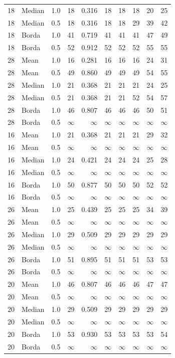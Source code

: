\begin{longtable}{llrrr rr r rr}
18 & Median & 1.0 & 18 & 0.316 & 18 & 18 & 18 & 20 & 25 \\
18 & Median & 0.5 & 18 & 0.316 & 18 & 18 & 29 & 39 & 42 \\
18 & Borda & 1.0 & 41 & 0.719 & 41 & 41 & 41 & 47 & 49 \\
18 & Borda & 0.5 & 52 & 0.912 & 52 & 52 & 52 & 55 & 55 \\
28 & Mean & 1.0 & 16 & 0.281 & 16 & 16 & 16 & 24 & 31 \\
28 & Mean & 0.5 & 49 & 0.860 & 49 & 49 & 49 & 54 & 55 \\
28 & Median & 1.0 & 21 & 0.368 & 21 & 21 & 21 & 24 & 25 \\
28 & Median & 0.5 & 21 & 0.368 & 21 & 21 & 52 & 54 & 57 \\
28 & Borda & 1.0 & 46 & 0.807 & 46 & 46 & 46 & 50 & 51 \\
28 & Borda & 0.5 & $\infty$ & $\infty$ & $\infty$ & $\infty$ & $\infty$ & $\infty$ & $\infty$ \\
16 & Mean & 1.0 & 21 & 0.368 & 21 & 21 & 21 & 29 & 32 \\
16 & Mean & 0.5 & $\infty$ & $\infty$ & $\infty$ & $\infty$ & $\infty$ & $\infty$ & $\infty$ \\
16 & Median & 1.0 & 24 & 0.421 & 24 & 24 & 24 & 25 & 28 \\
16 & Median & 0.5 & $\infty$ & $\infty$ & $\infty$ & $\infty$ & $\infty$ & $\infty$ & $\infty$ \\
16 & Borda & 1.0 & 50 & 0.877 & 50 & 50 & 50 & 52 & 52 \\
16 & Borda & 0.5 & $\infty$ & $\infty$ & $\infty$ & $\infty$ & $\infty$ & $\infty$ & $\infty$ \\
26 & Mean & 1.0 & 25 & 0.439 & 25 & 25 & 25 & 34 & 39 \\
26 & Mean & 0.5 & $\infty$ & $\infty$ & $\infty$ & $\infty$ & $\infty$ & $\infty$ & $\infty$ \\
26 & Median & 1.0 & 29 & 0.509 & 29 & 29 & 29 & 29 & 29 \\
26 & Median & 0.5 & $\infty$ & $\infty$ & $\infty$ & $\infty$ & $\infty$ & $\infty$ & $\infty$ \\
26 & Borda & 1.0 & 51 & 0.895 & 51 & 51 & 51 & 53 & 53 \\
26 & Borda & 0.5 & $\infty$ & $\infty$ & $\infty$ & $\infty$ & $\infty$ & $\infty$ & $\infty$ \\
20 & Mean & 1.0 & 46 & 0.807 & 46 & 46 & 46 & 47 & 47 \\
20 & Mean & 0.5 & $\infty$ & $\infty$ & $\infty$ & $\infty$ & $\infty$ & $\infty$ & $\infty$ \\
20 & Median & 1.0 & 29 & 0.509 & 29 & 29 & 29 & 29 & 29 \\
20 & Median & 0.5 & $\infty$ & $\infty$ & $\infty$ & $\infty$ & $\infty$ & $\infty$ & $\infty$ \\
20 & Borda & 1.0 & 53 & 0.930 & 53 & 53 & 53 & 53 & 54 \\
20 & Borda & 0.5 & $\infty$ & $\infty$ & $\infty$ & $\infty$ & $\infty$ & $\infty$ & $\infty$ \\
\bottomrule\end{longtable}
